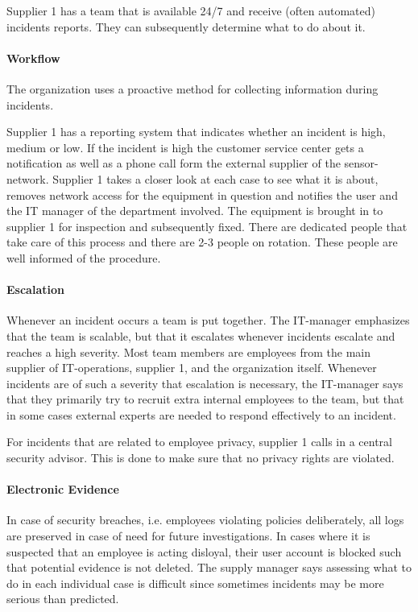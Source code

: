 Supplier 1 has a team that is available 24/7 and receive (often automated) incidents reports. They can subsequently determine what to do about it.

\paragraph{Workflow}
The organization uses a proactive method for collecting information during incidents. %

Supplier 1 has a reporting system that indicates whether an incident is high, medium or low. If the incident is high the customer service center gets a notification as well as a phone call form the external supplier of the sensor-network. Supplier 1 takes a closer look at each case to see what it is about, removes network access for the equipment in question and notifies the user and the IT manager of the department involved. The equipment is brought in to supplier 1 for inspection and subsequently fixed. There are dedicated people that take care of this process and there are 2-3 people on rotation. These people are well informed of the procedure.  

\paragraph{Escalation}
Whenever an incident occurs a team is put together. The IT-manager emphasizes that the team is scalable, but that it escalates whenever incidents escalate and reaches a high severity. Most team members are employees from the main supplier of IT-operations, supplier 1, and the organization itself. Whenever incidents are of such a severity that escalation is necessary, the IT-manager says that they primarily try to recruit extra internal employees to the team, but that in some cases external experts are needed to respond effectively to an incident.

For incidents that are related to employee privacy, supplier 1 calls in a central security advisor. This is done to make sure that no privacy rights are violated.

\paragraph{Electronic Evidence}
In case of security breaches, i.e. employees violating policies deliberately, all logs are preserved in case of need for future investigations. In cases where it is suspected that an employee is acting disloyal, their user account is blocked such that potential evidence is not deleted. The supply manager says assessing what to do in each individual case is difficult since sometimes incidents may be more serious than predicted. 

